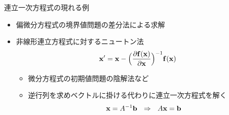\begin{frame}[t,fragile]{連立一次方程式の現れる例}
  \begin{itemize}
  \item 偏微分方程式の境界値問題の差分法による求解
  \item 非線形連立方程式に対するニュートン法
    \[ {\bf x}' = {\bf x} - \Big( \frac{\partial {\bf f}({\bf x})}{\partial {\bf x}} \Big)^{-1} {\bf f}({\bf x}) \]
    \begin{itemize}
    \item 微分方程式の初期値問題の陰解法など
    \item 逆行列を求めベクトルに掛ける代わりに連立一次方程式を解く
      \[ {\bf x} = A^{-1} {\bf b} \ \ \Rightarrow \ \ A {\bf x} = {\bf b} \]
    \end{itemize}
  \end{itemize}
\end{frame}
